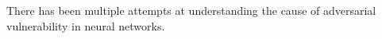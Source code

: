 There has been multiple attempts at understanding the cause of adversarial vulnerability in neural networks.~\citet{cisse17a}